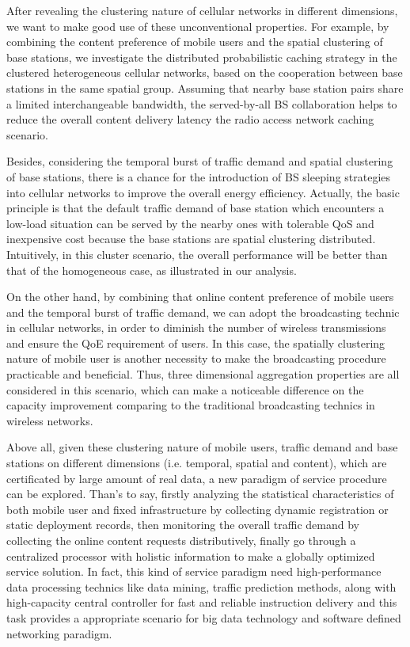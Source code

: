 After revealing the clustering nature of cellular networks in different dimensions, we want to make good use of these unconventional properties. For example, by combining the content preference of mobile users and the spatial clustering of base stations, we investigate the distributed probabilistic caching strategy in the clustered heterogeneous cellular networks, based on the cooperation between base stations in the same spatial group. Assuming that nearby base station pairs share a limited interchangeable bandwidth, the served-by-all BS collaboration helps to reduce the overall content delivery latency the radio access network caching scenario.

Besides, considering the temporal burst of traffic demand and spatial clustering of base stations, there is a chance for the introduction of BS sleeping strategies into cellular networks to improve the overall energy efficiency. Actually, the basic principle is that the default traffic demand of base station which encounters a low-load situation can be served by the nearby ones with tolerable QoS and inexpensive cost because the base stations are spatial clustering distributed. Intuitively, in this cluster scenario, the overall performance will be better than that of the homogeneous case, as illustrated in our analysis.

On the other hand, by combining that online content preference of mobile users and the temporal burst of traffic demand, we can adopt the broadcasting technic in cellular networks, in order to diminish the number of wireless transmissions and ensure the QoE requirement of users. In this case, the spatially clustering nature of mobile user is another necessity to make the broadcasting procedure practicable and beneficial. Thus, three dimensional aggregation properties are all considered in this scenario, which can make a noticeable difference on the capacity improvement comparing to the traditional broadcasting technics in wireless networks.

Above all, given these clustering nature of mobile users, traffic demand and base stations on different dimensions (i.e. temporal, spatial and content), which are certificated by large amount of real data, a new paradigm of service procedure can be explored. Than's to say, firstly analyzing the statistical characteristics of both mobile user and fixed infrastructure by collecting dynamic registration or static deployment records, then monitoring the overall traffic demand by collecting the online content requests distributively, finally go through a centralized processor with holistic information to make a globally optimized service solution. In fact, this kind of service paradigm need high-performance data processing technics like data mining, traffic prediction methods, along with high-capacity central controller for fast and reliable instruction delivery and this task provides a appropriate scenario for big data technology and software defined networking paradigm.

